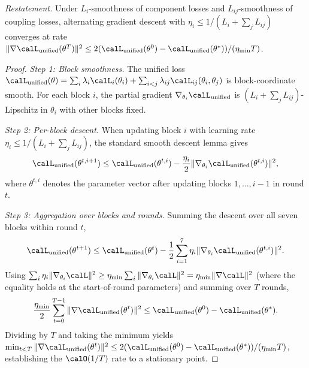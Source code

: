 \noindent\textit{Restatement.} Under $L_i$-smoothness of component losses and $L_{ij}$-smoothness of coupling losses, alternating gradient descent with $\eta_i\le 1/(L_i+\sum_j L_{ij})$ converges at rate $\|\nabla\calL_{\mathrm{unified}}(\theta^T)\|^2\le 2(\calL_{\mathrm{unified}}(\theta^0)-\calL_{\mathrm{unified}}(\theta^*))/(\eta_{\min}T)$.

\begin{proof}
\textit{Step 1: Block smoothness.} The unified loss $\calL_{\mathrm{unified}}(\theta) = \sum_i\lambda_i\calL_i(\theta_i) + \sum_{i<j}\lambda_{ij}\calL_{ij}(\theta_i,\theta_j)$ is block-coordinate smooth. For each block $i$, the partial gradient $\nabla_{\theta_i}\calL_{\mathrm{unified}}$ is $(L_i+\sum_j L_{ij})$-Lipschitz in $\theta_i$ with other blocks fixed.

\textit{Step 2: Per-block descent.} When updating block $i$ with learning rate $\eta_i\le 1/(L_i+\sum_j L_{ij})$, the standard smooth descent lemma gives
\begin{equation}
\calL_{\mathrm{unified}}(\theta^{t,i+1}) \le \calL_{\mathrm{unified}}(\theta^{t,i}) - \frac{\eta_i}{2}\|\nabla_{\theta_i}\calL_{\mathrm{unified}}(\theta^{t,i})\|^2,
\end{equation}
where $\theta^{t,i}$ denotes the parameter vector after updating blocks $1,\ldots,i{-}1$ in round $t$.

\textit{Step 3: Aggregation over blocks and rounds.} Summing the descent over all seven blocks within round $t$,
\begin{equation}
\calL_{\mathrm{unified}}(\theta^{t+1}) \le \calL_{\mathrm{unified}}(\theta^{t}) - \frac{1}{2}\sum_{i=1}^7\eta_i\|\nabla_{\theta_i}\calL_{\mathrm{unified}}(\theta^{t,i})\|^2.
\end{equation}
Using $\sum_i\eta_i\|\nabla_{\theta_i}\calL\|^2\ge\eta_{\min}\sum_i\|\nabla_{\theta_i}\calL\|^2 = \eta_{\min}\|\nabla\calL\|^2$ (where the equality holds at the start-of-round parameters) and summing over $T$ rounds,
\begin{equation}
\frac{\eta_{\min}}{2}\sum_{t=0}^{T-1}\|\nabla\calL_{\mathrm{unified}}(\theta^t)\|^2
\le \calL_{\mathrm{unified}}(\theta^0) - \calL_{\mathrm{unified}}(\theta^*).
\end{equation}
Dividing by $T$ and taking the minimum yields $\min_{t<T}\|\nabla\calL_{\mathrm{unified}}(\theta^t)\|^2\le 2(\calL_{\mathrm{unified}}(\theta^0)-\calL_{\mathrm{unified}}(\theta^*))/(\eta_{\min}T)$, establishing the $\calO(1/T)$ rate to a stationary point.
\end{proof}


